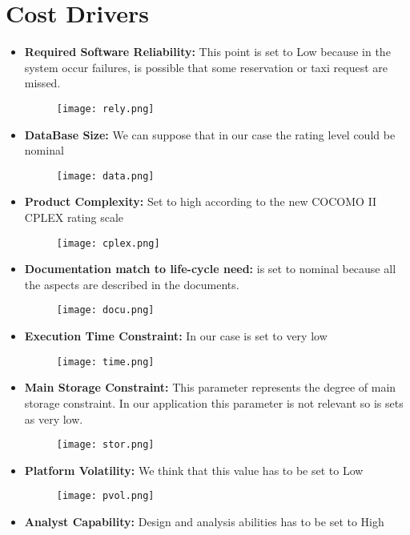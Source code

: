 \documentclass[12pt, oneside]{book}   	%
\begin{document}
\section{Cost Drivers}
\begin{itemize}
\item \textbf{Required Software Reliability:} This point is set to Low because in the system occur failures, is possible that some reservation or taxi request are missed.
\begin{figure}[h]
\centering
\texttt{[image: rely.png]}
\end{figure}
\item \textbf{DataBase Size:} We can suppose that in our case the rating level could be nominal
\begin{figure}[h]
\centering
\texttt{[image: data.png]}
\end{figure}
\item \textbf{Product Complexity:} Set to high according to the new COCOMO II CPLEX rating scale
\begin{figure}[h]
\centering
\texttt{[image: cplex.png]}
\end{figure}
\clearpage
\item \textbf{Documentation match to life-cycle need:} is set to nominal because all the aspects are described in the documents.
\begin{figure}[h]
\centering
\texttt{[image: docu.png]}
\end{figure} 
\item \textbf{Execution Time Constraint:} In our case is set to very low
\begin{figure}[h]
\centering
\texttt{[image: time.png]}
\end{figure}
\item \textbf{Main Storage Constraint:} This parameter represents the degree of main storage constraint. In our application this parameter is not relevant so is sets as very low.
\begin{figure}[h]
\centering
\texttt{[image: stor.png]}
\end{figure}
\clearpage
\item \textbf{Platform Volatility:} We think that this value has to be set to Low
\begin{figure}[h]
\centering
\texttt{[image: pvol.png]}
\end{figure}
\item \textbf{Analyst Capability:} Design and analysis abilities has to be set to High

\end{itemize}
\end{document}
